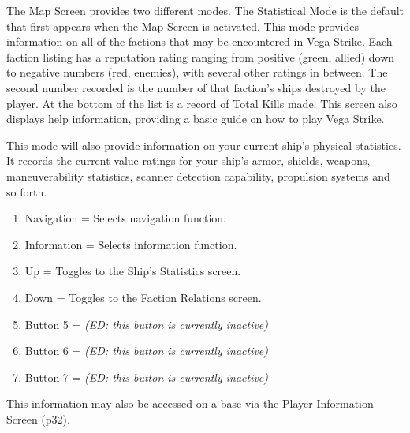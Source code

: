 \documentclass{article}
\begin{document}
The Map Screen provides two different modes. The Statistical Mode is the default that first appears when the Map Screen is activated. This mode provides information on all of the factions that may be encountered in Vega Strike. Each faction listing has a reputation rating ranging from positive (green, allied) down to negative numbers (red, enemies), with several other ratings in between. The second number recorded is the number of that faction's ships destroyed by the player. At the bottom of the list is a record of Total Kills made. This screen also displays help information, providing a basic guide on how to play Vega Strike. 

















This mode will also provide information on your current ship's physical statistics. It records the current value ratings for your ship's armor, shields, weapons, maneuverability statistics, scanner detection capability, propulsion systems and so forth. 

\begin{enumerate}
\item  Navigation = Selects navigation function. 

\item  Information = Selects information function. 

\item  Up = Toggles to the Ship's Statistics screen. 

\item  Down = Toggles to the Faction Relations screen. 

\item  Button 5 = \textit{(ED: this button is currently inactive) }

\item \textit{ }Button 6 = \textit{(ED: this button is currently inactive) }

\item \textit{ }Button 7 = \textit{(ED: this button is currently inactive) }
\end{enumerate}



This information may also be accessed on a base via the Player Information Screen (p32). 
\end{document}
